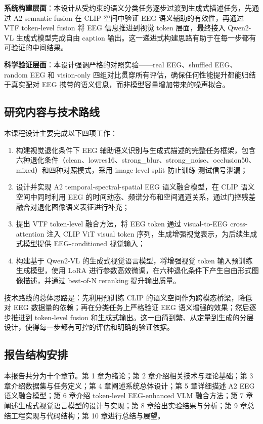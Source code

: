 \textbf{系统构建层面}：本设计从受约束的语义分类任务逐步过渡到生成式描述任务，先通过 A2 semantic fusion 在 CLIP 空间中验证 EEG 语义辅助的有效性，再通过 VTF token-level fusion 将 EEG 信息推进到视觉 token 层面，最终接入 Qwen2-VL 生成式模型完成自由 caption 输出。这一递进式构建思路有助于在每一步都有可验证的中间结果。

\textbf{科学验证层面}：本设计强调严格的对照实验——real EEG、shuffled EEG、random EEG 和 vision-only 四组对比贯穿所有评估，确保任何性能提升都能归结于真实配对 EEG 携带的语义信息，而非模型容量增加带来的噪声拟合。

\subsection{研究内容与技术路线}

本课程设计主要完成以下四项工作：

\begin{enumerate}
  \item 构建视觉退化条件下 EEG 辅助语义识别与生成式描述的完整任务框架，包含六种退化条件（clean、lowres16、strong\_blur、strong\_noise、occlusion50、mixed）和四种对照模式，采用 image-level split 防止训练-测试信号泄漏；
  \item 设计并实现 A2 temporal-spectral-spatial EEG 语义融合模型，在 CLIP 语义空间中同时利用 EEG 的时间动态、频谱分布和空间通道关系，通过门控残差融合对退化图像语义表征进行补充；
  \item 提出 VTF token-level 融合方法，将 EEG token 通过 visual-to-EEG cross-attention 注入 CLIP ViT visual token 序列，生成增强视觉表示，为后续生成式模型提供 EEG-conditioned 视觉输入；
  \item 构建基于 Qwen2-VL 的生成式视觉语言模型，将增强视觉 token 输入预训练生成模型，使用 LoRA 进行参数高效微调，在六种退化条件下产生自由形式图像描述，并通过 best-of-N reranking 提升输出质量。
\end{enumerate}

技术路线的总体思路是：先利用预训练 CLIP 的语义空间作为跨模态桥梁，降低对 EEG 数据量的依赖；再在分类任务上严格验证 EEG 语义增强的效果；然后逐步推进到 token-level fusion 和生成式输出。这一由简到繁、从定量到生成的分层设计，使得每一步都有可控的评估和明确的验证依据。

\subsection{报告结构安排}

本报告共分为十个章节。第 1 章为绪论；第 2 章介绍相关技术与理论基础；第 3 章介绍数据集与任务定义；第 4 章阐述系统总体设计；第 5 章详细描述 A2 EEG 语义融合模型；第 6 章介绍 token-level EEG-enhanced VLM 融合方法；第 7 章阐述生成式视觉语言模型的设计与实现；第 8 章给出实验结果与分析；第 9 章总结工程实现与代码结构；第 10 章进行总结与展望。
